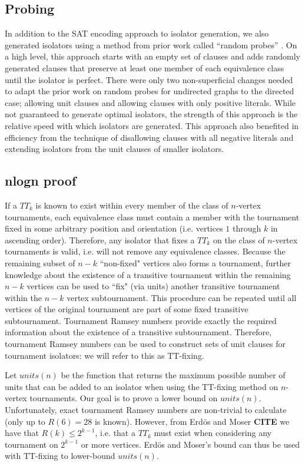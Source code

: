 \documentclass[a4paper,UKenglish,cleveref, autoref, thm-restate]{lipics-v2021}
\begin{document}
\subsection{Probing}
In addition to the SAT encoding approach to isolator generation, we also generated isolators using a method from prior work called ``random probes''  \cite{ref_heule}. On a high level, this approach starts with an empty set of clauses and adds randomly generated clauses that preserve at least one member of each equivalence class until the isolator is perfect.  There were only two non-superficial changes needed to adapt the prior work on random probes for undirected graphs to the directed case; allowing unit clauses and allowing clauses with only positive literals. While not guaranteed to generate optimal isolators, the strength of this approach is the relative speed with which isolators are generated. This approach also benefited in efficiency from the technique of disallowing clauses with all negative literals and extending isolators from the unit clauses of smaller isolators.

\subsection{nlogn proof}
If a $TT_k$ is known to exist within every member of the class of $n$-vertex tournaments, each equivalence class must contain a member with the tournament fixed in some arbitrary position and orientation (i.e. vertices $1$ through $k$ in ascending order). Therefore, any isolator that fixes a $TT_k$ on the class of $n$-vertex tournaments is valid, i.e. will not remove any equivalence classes. Because the remaining subset of $n-k$ ``non-fixed" vertices also forms a tournament, further knowledge about the existence of a transitive tournament within the remaining $n-k$ vertices can be used to ``fix" (via units) another transitive tournament within the $n-k$ vertex subtournament. This procedure can be repeated until all vertices of the original tournament are part of some fixed transitive subtournament. Tournament Ramsey numbers provide exactly the required information about the existence of a transitive subtournament. Therefore, tournament Ramsey numbers can be used to construct sets of unit clauses for tournament isolators: we will refer to this as TT-fixing.

Let $units(n)$ be the function that returns the maximum possible number of units that can be added to an isolator when using the TT-fixing method on $n$-vertex tournaments. Our goal is to prove a lower bound on $units(n)$. Unfortunately, exact tournament Ramsey numbers are non-trivial to calculate (only up to $R(6) = 28$ is known). However, from Erd{\"o}s and Moser \textbf{CITE} we have that $R(k) \leq 2^{k-1}$, i.e. that a $TT_{k}$ must exist when considering any tournament on $2^{k-1}$ or more vertices. Erd{\"o}s and Moser's bound can thus be used with TT-fixing to lower-bound $units(n)$.
\end{document}
